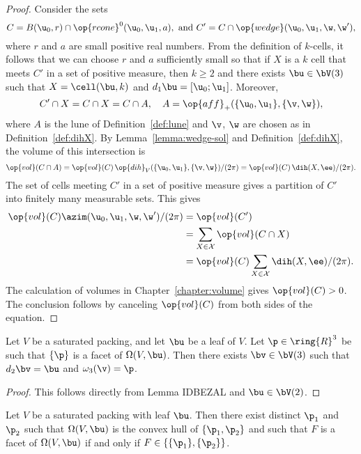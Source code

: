 \begin{proof} 
  Consider the sets
\[
C=B(\u_0,r)\cap \op{rcone}^0(\u_0,\u_1,a),\text{ and } C' = C\cap \op{wedge}(\u_0,\u_1,\w,\w') ,
\]
 where
  $r$ and $a$ are small positive real numbers.  From the definition of
  $k$-cells, it follows that we can choose $r$ and $a$ sufficiently
  small so that if $X$ is a $k$ cell that meets $C'$ in a set of
  positive measure, then $k\ge 2$ and there exists $\bu\in \bV(3)$
  such that $X=\cell(\bu,k)$ and $d_1\bu=[\u_0;\u_1]$.  Moreover,
\[
C'\cap X = C\cap X = C\cap A, \quad A=\op{aff}_+(\{\u_0,\u_1\},\{\v,\w\}),
\]
where $A$ is the lune of Definition~\ref{def:lune} and $\v$, $\w$ are
chosen as in Definition~\ref{def:dihX}.  By
Lemma~\ref{lemma:wedge-sol} and Definition~\ref{def:dihX}, the volume
of this intersection is
\[
\op{vol}(C\cap A) = \op{vol}(C)\,
 {\op{dih}_V(\{\u_0,\u_1\},\{\v,\w\}) }/{(2\pi)} =
  \op{vol}(C)\, {\dih(X,\ee)}/{(2\pi)}.
\]
The set of cells meeting $C'$ in a set of positive measure gives a 
partition of $C'$ into finitely many measurable sets.
This gives
\begin{align*}
\op{vol}(C) \azim(\u_0,\u_1,\w,\w')/(2\pi) &= 
\op{vol}(C') \\
&= \sum_{X\in\cX} \op{vol}(C\cap X)  \\
&= \op{vol}(C)\sum_{X\in\cX} \dih(X,\ee)/(2\pi).
\end{align*}
The calculation of volumes in Chapter~\ref{chapter:volume} gives
$\op{vol}(C)>0$.  The conclusion follows by canceling $\op{vol}(C)$
from both sides of the equation.
\end{proof}




\begin{lemma}\label{lemma:facetv}  Let $V$ be a saturated packing, and let $\bu$ be a leaf of $V$.  Let
$\p\in\ring{R}^3$ be such that $\{\p\}$ is a facet of $\Omega(V,\bu)$.  Then
there exists $\bv\in \bV(3)$ such that $d_2\bv = \bu$ and $\omega_3(\v)=\p$.
\end{lemma}

\begin{proof} This follows directly from Lemma IDBEZAL and $\bu\in \bV(2)$.
\end{proof}

\begin{lemma}\label{lemma:p1p2} 
Let $V$ be a saturated packing with leaf $\bu$.  Then there exist distinct $\p_1$ and $\p_2$ such
that $\Omega(V,\bu)$ is the convex hull of $\{\p_1,\p_2\}$ and such that
$F$ is a facet of $\Omega(V,\bu)$ if and only if $F\in \{\{\p_1\},\{\p_2\}\}$.
\end{lemma}

